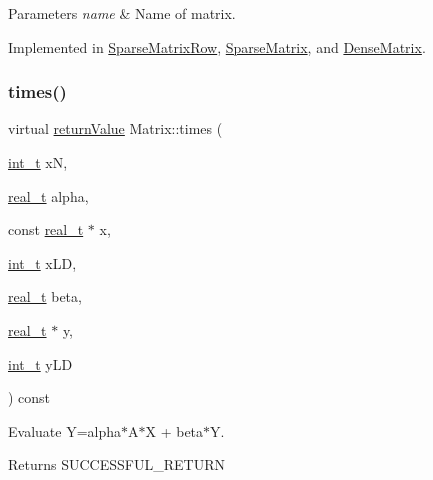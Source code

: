 \begin{DoxyParams}{Parameters}
{\em name} & Name of matrix. \\
\hline
\end{DoxyParams}


Implemented in \hyperlink{class_sparse_matrix_row_a471469c7fc2240bd379b8a3aa64634a9}{Sparse\+Matrix\+Row}, \hyperlink{class_sparse_matrix_aa27acfde647c2648d1b8e71a0a53c39e}{Sparse\+Matrix}, and \hyperlink{class_dense_matrix_a248f137d9f0f1cd385d9c73a847bf88e}{Dense\+Matrix}.

\mbox{\label{class_matrix_a329b638ce6ce41715b156766646b3fcc}} 
\subsubsection{\texorpdfstring{times()}{times()}\hspace{0.1cm}{\footnotesize\ttfamily [1/2]}}
{\footnotesize\ttfamily virtual \hyperlink{_message_handling_8hpp_a81d556f613bfbabd0b1f9488c0fa865e}{return\+Value} Matrix\+::times (\begin{DoxyParamCaption}\item[{\hyperlink{_types_8hpp_ab6fd6105e64ed14a0c9281326f05e623}{int\+\_\+t}}]{xN,  }\item[{\hyperlink{qp_o_a_s_e_s__wrapper_8h_a0d00e2b3dfadee81331bbb39068570c4}{real\+\_\+t}}]{alpha,  }\item[{const \hyperlink{qp_o_a_s_e_s__wrapper_8h_a0d00e2b3dfadee81331bbb39068570c4}{real\+\_\+t} $\ast$}]{x,  }\item[{\hyperlink{_types_8hpp_ab6fd6105e64ed14a0c9281326f05e623}{int\+\_\+t}}]{x\+LD,  }\item[{\hyperlink{qp_o_a_s_e_s__wrapper_8h_a0d00e2b3dfadee81331bbb39068570c4}{real\+\_\+t}}]{beta,  }\item[{\hyperlink{qp_o_a_s_e_s__wrapper_8h_a0d00e2b3dfadee81331bbb39068570c4}{real\+\_\+t} $\ast$}]{y,  }\item[{\hyperlink{_types_8hpp_ab6fd6105e64ed14a0c9281326f05e623}{int\+\_\+t}}]{y\+LD }\end{DoxyParamCaption}) const\hspace{0.3cm}{\ttfamily [pure virtual]}}

Evaluate Y=alpha$\ast$\+A$\ast$X + beta$\ast$Y. \begin{DoxyReturn}{Returns}
S\+U\+C\+C\+E\+S\+S\+F\+U\+L\+\_\+\+R\+E\+T\+U\+RN 
\end{DoxyReturn}

